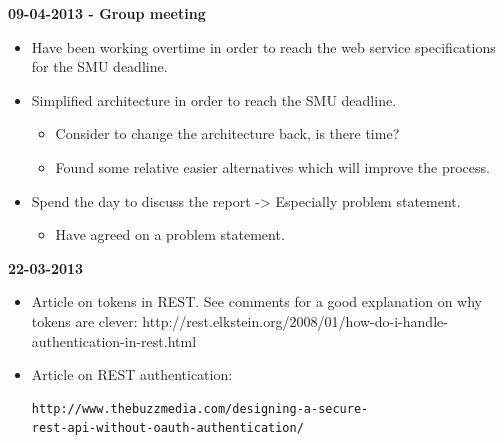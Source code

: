 \documentclass[11pt]{article}
\begin{document}
\begin{landscape}
\begin{multicols}{2}
\textbf{09-04-2013 - Group meeting}
\begin{itemize}
\item Have been working overtime in order to reach the web service specifications for the SMU deadline.
\item Simplified architecture in order to reach the SMU deadline.
\begin{itemize}
\item Consider to change the architecture back, is there time?
\item Found some relative easier alternatives which will improve the process.
\end{itemize}
\item Spend the day to discuss the report -> Especially problem statement.
\begin{itemize}
\item Have agreed on a problem statement.
\end{itemize}
\end{itemize}

\textbf{22-03-2013}
\begin{itemize}
\item Article on tokens in REST. See comments for a good explanation on why tokens are clever: http://rest.elkstein.org/2008/01/how-do-i-handle-authentication-in-rest.html 
\item Article on REST authentication: \begin{verbatim}
http://www.thebuzzmedia.com/designing-a-secure-
rest-api-without-oauth-authentication/ 
\end{verbatim}
\end{itemize}


\end{multicols}
\end{landscape}
\end{document}
